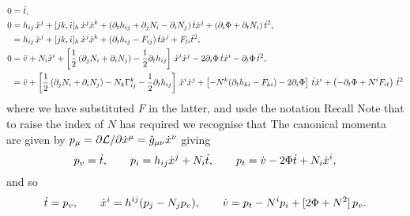\documentclass{article}
\begin{document}
\begin{align*}
0&=\ddot t,\\
0&= h_{ij}\,\ddot x\sp{j}+[jk,i]_h\, \dot x\sp{j} \dot x\sp{k} +
(\partial_t h_{ij}+\partial_j N_i-\partial_i N_j) \,\dot t \dot x\sp{j} +\left(\partial_i\Phi+\partial_t N_i\right) \dot t^2,\\
&= h_{ij}\,\ddot x\sp{j}+[jk,i]_h\, \dot x\sp{j} \dot x\sp{k}+ (\partial_t h_{ij} -F_{ij})\, \dot t \dot x\sp{j}
+F_{ti}\dot t\sp2,\\
0&=\ddot v+ N_i\ddot x\sp{i}+ \left[ \frac12 \left(\partial_j N_i+\partial_i N_j\right)- \frac12 \partial_t h_{ij}
\right]\,\dot x\sp{i} \dot x\sp{j} -2\partial_i\Phi \,\dot t \dot x\sp{i} - \partial_t\Phi\, \dot t^2,\\
&=\ddot v+
 \left[ \frac12 \left(\partial_j N_i+\partial_i N_j\right)-N_k \Gamma\sp{k}_{ij}- \frac12 \partial_t h_{ij}
\right]\,\dot x\sp{i} \dot x\sp{j} 
+\left[ -N\sp{k} (\partial_t h_{ki} -F_{ki}) -2\partial_i\Phi \right]\,\dot t \dot x\sp{i} 
+\left(- \partial_t\Phi +N\sp{i}F_{it} \right)\, \dot t^2
\end{align*}
where we have substituted $F$ in the latter, and usde the notation
Recall 
Note that to raise the index of $N$ has required we recognise that 
The canonical momenta are given by $p_\mu =\partial \mathcal{L}/\partial \dot x\sp{\mu}=\hat{g}_{\mu\nu}\dot{x}^\nu$ giving
$$p_v =\dot t,\qquad p_i=h_{ij} \dot x\sp{j} +N_i \dot t, \qquad p_t=\dot v- 2\Phi \dot t +N_i \dot x\sp{i},
$$
and so
$$\dot t=p_v,\qquad  \dot x\sp{i}=h\sp{ij}(p_j- N_j p_v),\qquad \dot v=p_t-N\sp{i} p_i+[2\Phi +N^2]\, p_v.$$
\end{document}
